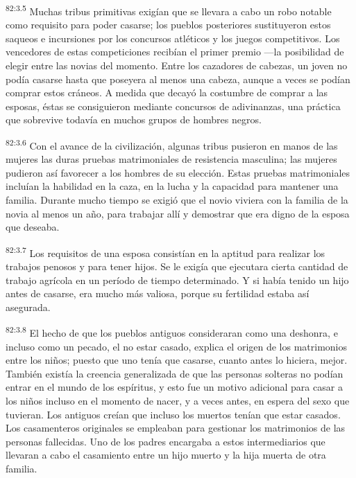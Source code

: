 \par
\textsuperscript{82:3.5} Muchas tribus primitivas exigían que se llevara a cabo un robo notable como requisito para poder casarse; los pueblos posteriores sustituyeron estos saqueos e incursiones por los concursos atléticos y los juegos competitivos. Los vencedores de estas competiciones recibían el primer premio ---la posibilidad de elegir entre las novias del momento. Entre los cazadores de cabezas, un joven no podía casarse hasta que poseyera al menos una cabeza, aunque a veces se podían comprar estos cráneos. A medida que decayó la costumbre de comprar a las esposas, éstas se consiguieron mediante concursos de adivinanzas, una práctica que sobrevive todavía en muchos grupos de hombres negros.

\par
\textsuperscript{82:3.6} Con el avance de la civilización, algunas tribus pusieron en manos de las mujeres las duras pruebas matrimoniales de resistencia masculina; las mujeres pudieron así favorecer a los hombres de su elección. Estas pruebas matrimoniales incluían la habilidad en la caza, en la lucha y la capacidad para mantener una familia. Durante mucho tiempo se exigió que el novio viviera con la familia de la novia al menos un año, para trabajar allí y demostrar que era digno de la esposa que deseaba.

\par
\textsuperscript{82:3.7} Los requisitos de una esposa consistían en la aptitud para realizar los trabajos penosos y para tener hijos. Se le exigía que ejecutara cierta cantidad de trabajo agrícola en un período de tiempo determinado. Y si había tenido un hijo antes de casarse, era mucho más valiosa, porque su fertilidad estaba así asegurada.

\par
\textsuperscript{82:3.8} El hecho de que los pueblos antiguos consideraran como una deshonra, e incluso como un pecado, el no estar casado, explica el origen de los matrimonios entre los niños; puesto que uno tenía que casarse, cuanto antes lo hiciera, mejor. También existía la creencia generalizada de que las personas solteras no podían entrar en el mundo de los espíritus, y esto fue un motivo adicional para casar a los niños incluso en el momento de nacer, y a veces antes, en espera del sexo que tuvieran. Los antiguos creían que incluso los muertos tenían que estar casados. Los casamenteros originales se empleaban para gestionar los matrimonios de las personas fallecidas. Uno de los padres encargaba a estos intermediarios que llevaran a cabo el casamiento entre un hijo muerto y la hija muerta de otra familia.

